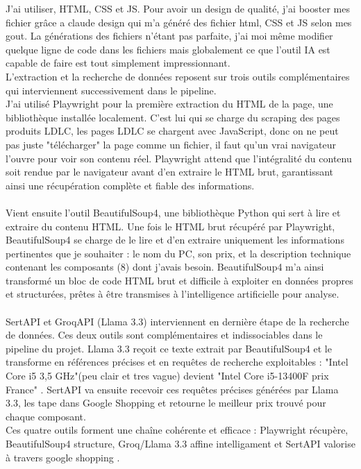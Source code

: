 \documentclass[a4paper, 12pt, twoside]{article}
\begin{document}
J’ai utiliser, HTML, CSS et JS. Pour avoir un design de qualité, j’ai booster mes fichier grâce a claude design qui m’a généré des fichier html, CSS et JS selon mes gout. La générations des fichiers n’étant pas parfaite, j’ai moi même modifier quelque ligne de code dans les fichiers mais globalement ce que l’outil IA est capable de faire est tout simplement impressionnant.\\

L'extraction et la recherche de données reposent sur trois outils complémentaires qui interviennent successivement dans le pipeline.\\
J’ai utilisé Playwright pour la première extraction du HTML de la page, une bibliothèque installée localement. C'est lui qui se charge du scraping des pages produits LDLC, les pages LDLC se chargent avec JavaScript, donc on ne peut pas juste "télécharger" la page comme un fichier, il faut qu'un vrai navigateur l'ouvre pour voir son contenu réel. Playwright attend que l'intégralité du contenu soit rendue par le navigateur avant d'en extraire le HTML brut, garantissant ainsi une récupération complète et fiable des informations.\\
\\
Vient ensuite l’outil BeautifulSoup4, une bibliothèque Python qui sert à lire et extraire du contenu HTML. Une fois le HTML brut récupéré par Playwright, BeautifulSoup4 se charge de le lire et d'en extraire uniquement les informations pertinentes que je souhaiter  : le nom du PC, son prix, et la description technique contenant les composants (8) dont j’avais besoin. BeautifulSoup4 m'a ainsi transformé un bloc de code HTML brut et difficile à exploiter en données propres et structurées, prêtes à être transmises à l’intelligence artificielle pour analyse.\\
\\
 SertAPI et GroqAPI (Llama 3.3) interviennent en dernière étape de la recherche de données. Ces deux outils sont complémentaires et indissociables dans le pipeline du projet. Llama 3.3 reçoit ce texte extrait par BeautifulSoup4 et le transforme en références précises et en requêtes de recherche exploitables : "Intel Core i5 3,5 GHz"(peu clair et tres vague) devient "Intel Core i5-13400F prix France" .  SertAPI va ensuite recevoir ces requêtes précises générées par Llama 3.3, les tape dans Google Shopping et retourne le meilleur prix trouvé pour chaque composant. \\
Ces quatre outils forment une chaîne cohérente et efficace : Playwright récupère, BeautifulSoup4 structure, Groq/Llama 3.3 affine intelligament et  SertAPI valorise à travers google shopping .\\
\end{document}
